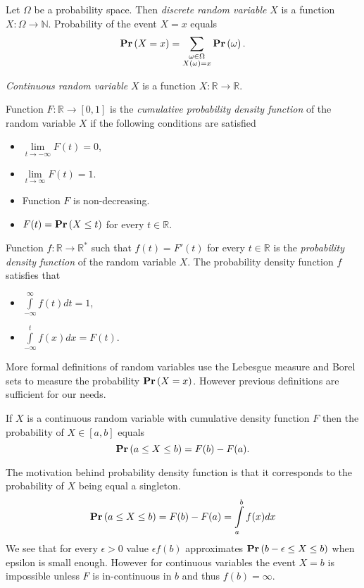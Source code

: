 \begin{definition}
Let $\Omega$ be a probability space. Then \emph{discrete random variable} $X$ is a function $X: \Omega \rightarrow \mathbb{N}$. Probability of the event $X = x$ equals
\[
\mathbf{Pr}\left(X = x\right) = \displaystyle\sum_{\substack{\omega \in \Omega \\ X(\omega) = x}} \mathbf{Pr}\left(\omega\right) \text{.}
\]
\end{definition}

\begin{definition}
\emph{Continuous random variable} $X$ is a function $X: \mathbb{R} \rightarrow \mathbb{R}$. 

Function $F: \mathbb{R} \rightarrow \left[0, 1\right]$ is the \emph{cumulative probability density function} of the random variable $X$ if the following conditions are satisfied
\begin{itemize}
\item $\lim\limits_{t \rightarrow -\infty} F(t) = 0$,
\item $\lim\limits_{t \rightarrow \infty} F(t) = 1$.
\item Function $F$ is non-decreasing.
\item $F(t) = \mathbf{Pr}\left(X \leq t\right) $ for every $t \in \mathbb{R}$.
\end{itemize}

Function $f: \mathbb{R} \rightarrow \mathbb{R}^{*}$ such that $f(t) = F'(t)$ for every $t \in \mathbb{R}$ is the \emph{probability density function} of the random variable $X$. The probability density function $f$ satisfies that
\begin{itemize}
\item $\int\limits_{-\infty}^{\infty} f(t) dt = 1$,
\item $\int\limits_{-\infty}^{t} f(x) dx = F(t)$.
\end{itemize}
\end{definition}

More formal definitions of random variables use the Lebesgue measure and Borel sets to measure the probability $\mathbf{Pr}\left(X = x\right)$. However previous definitions are sufficient for our needs.

If $X$ is a continuous random variable with cumulative density function $F$ then the probability of $X \in \left[a, b\right]$ equals
\[
\mathbf{Pr}\left(a \leq X \leq b\right) = F(b) - F(a) \text{.}
\]

The motivation behind probability density function is that it corresponds to the probability of $X$ being equal a singleton.
\[
\mathbf{Pr}\left(a \leq X \leq b\right) = F(b) - F(a) = \int\limits_{a}^{b} f(x) dx
\]
We see that for every $\epsilon > 0$ value $\epsilon f(b)$ approximates $\mathbf{Pr}\left(b - \epsilon \leq X \leq b\right)$ when epsilon is small enough. However for continuous variables the event $X = b$ is impossible unless $F$ is in-continuous in $b$ and thus $f(b) = \infty$.	

